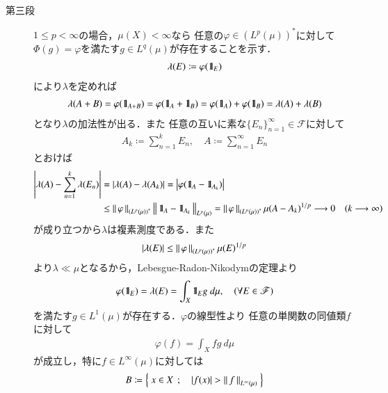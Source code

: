 \begin{prf}
\begin{description}
			\item[第三段]
				$1 \leq p < \infty$の場合，$\mu(X) < \infty$なら
				任意の$\varphi \in \left( L^p(\mu) \right)^*$に対して
				$\Phi(g) = \varphi$を満たす$g \in L^q(\mu)$が存在することを示す．
				\begin{align}
					\lambda(E) \coloneqq \varphi(\mbox{1}\hspace{-0.25em}\mbox{l}_E)
					\label{eq:thm_dual_space_of_L_p_7}
				\end{align}
				により$\lambda$を定めれば
				\begin{align}
					\lambda(A + B) = \varphi(\mbox{1}\hspace{-0.25em}\mbox{l}_{A+B}) = \varphi(\mbox{1}\hspace{-0.25em}\mbox{l}_A + \mbox{1}\hspace{-0.25em}\mbox{l}_B)
					= \varphi(\mbox{1}\hspace{-0.25em}\mbox{l}_A) + \varphi(\mbox{1}\hspace{-0.25em}\mbox{l}_B)
					= \lambda(A) + \lambda(B)
				\end{align}
				となり$\lambda$の加法性が出る．また
				任意の互いに素な$\{E_n\}_{n=1}^\infty \in \mathscr{F}$に対して
				\begin{align}
					A_k \coloneqq \sum_{n=1}^k E_n,
					\quad A \coloneqq \sum_{n=1}^\infty E_n
				\end{align}
				とおけば
				\begin{align}
					\left| \lambda(A) - \sum_{n=1}^k \lambda(E_n) \right|
					&= \left| \lambda(A) - \lambda(A_k) \right|
					= \left| \varphi(\mbox{1}\hspace{-0.25em}\mbox{l}_A - \mbox{1}\hspace{-0.25em}\mbox{l}_{A_k}) \right| \\
					&\leq \left\|\, \varphi\, \right\|_{\left( L^p(\mu) \right)^*} \left\|\, \mbox{1}\hspace{-0.25em}\mbox{l}_A - \mbox{1}\hspace{-0.25em}\mbox{l}_{A_k}\, \right\|_{L^p(\mu)}
					= \left\|\, \varphi\, \right\|_{\left( L^p(\mu) \right)^*} \mu(A - A_k)^{1/p}
					\longrightarrow 0
					\quad (k \longrightarrow \infty)
				\end{align}
				が成り立つから$\lambda$は複素測度である．また
				\begin{align}
					|\lambda(E)| \leq \left\|\, \varphi\, \right\|_{\left( L^p(\mu) \right)^*} \mu(E)^{1/p}
				\end{align}
				より$\lambda \ll \mu$となるから，Lebesgue-Radon-Nikodymの定理より
				\begin{align}
					\varphi(\mbox{1}\hspace{-0.25em}\mbox{l}_E) = \lambda(E) = \int_X \mbox{1}\hspace{-0.25em}\mbox{l}_E g\ d\mu,
					\quad (\forall E \in \mathscr{F})
					\label{eq:thm_dual_space_of_L_p_8}
				\end{align}
				を満たす$g \in L^1(\mu)$が存在する．$\varphi$の線型性より
				任意の単関数の同値類$f$に対して
				\begin{align}
					\varphi(f) = \int_X fg\ d\mu
					\label{eq:thm_dual_space_of_L_p_2}
				\end{align}
				が成立し，特に$f \in L^\infty(\mu)$に対しては
				\begin{align}
					B \coloneqq \Set{x \in X}{|f(x)| > \Norm{f}{L^\infty(\mu)}}

\end{align}
\end{description}
\end{prf}
